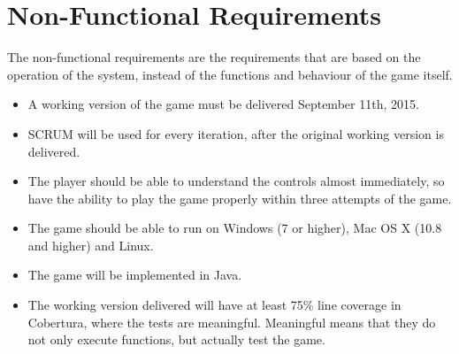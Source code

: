 \chapter{Non-Functional Requirements}

The non-functional requirements are the requirements that are based on the operation of the system, instead of the functions and behaviour of the game itself.

\begin{itemize}
\itemsep0em
	\item A working version of the game must be delivered September 11th, 2015.
	\item SCRUM will be used for every iteration, after the original working version is delivered.
	\item The player should be able to understand the controls almost immediately, so have the ability to play the game properly within three attempts of the game.
	\item The game should be able to run on Windows (7 or higher), Mac OS X (10.8 and higher) and Linux.
	\item The game will be implemented in Java. 
	\item The working version delivered will have at least 75\% line coverage in Cobertura, where the tests are meaningful. Meaningful means that they do not only execute functions, but actually test the game.
\end{itemize}
